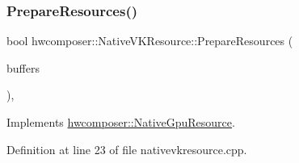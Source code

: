 \subsubsection{\texorpdfstring{Prepare\+Resources()}{PrepareResources()}}
{\footnotesize\ttfamily bool hwcomposer\+::\+Native\+V\+K\+Resource\+::\+Prepare\+Resources (\begin{DoxyParamCaption}\item[{const std\+::vector$<$ \mbox{\hyperlink{classhwcomposer_1_1OverlayBuffer}{Overlay\+Buffer}} $\ast$$>$ \&}]{buffers }\end{DoxyParamCaption})\hspace{0.3cm}{\ttfamily [override]}, {\ttfamily [virtual]}}



Implements \mbox{\hyperlink{classhwcomposer_1_1NativeGpuResource_a3f1da37f41ff245e1bfe9e44d69a3202}{hwcomposer\+::\+Native\+Gpu\+Resource}}.



Definition at line 23 of file nativevkresource.\+cpp.


